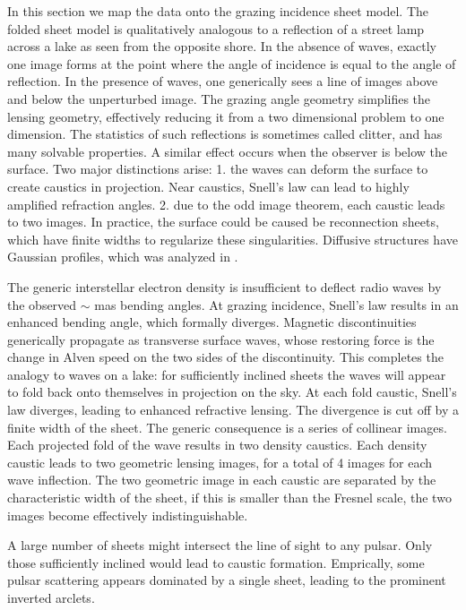 \documentclass[useAMS,usenatbib]{mn2e}
\begin{document}
In this section we map the data onto the grazing incidence sheet
model.  The folded sheet model is qualitatively analogous to a
reflection of a street lamp across a lake as seen from the opposite
shore.  In the absence of waves, exactly one image forms at the point
where the angle of incidence is equal to the angle of reflection.  In
the presence of waves, one generically sees a line of images above and
below the unperturbed image.  The grazing angle geometry simplifies
the lensing geometry, effectively reducing it from a two dimensional problem to
one dimension.  The statistics of such reflections is sometimes called
clitter, and has many solvable
properties\citep{LonguetHiggins1960}. 
A similar effect occurs when the
observer is below the surface.  Two major distinctions arise: 1. the
waves can deform the surface to create caustics in projection. Near
caustics, Snell's law can lead to highly amplified refraction
angles. 2. due to the odd image theorem, each caustic leads to two
images.  In practice, the surface could be caused be reconnection
sheets\citep{2015MNRAS.450.3201B}, which have finite widths to
regularize these singularities. Diffusive structures have Gaussian
profiles, which was analyzed in \citet{2012MNRAS.421L.132P}.

The generic interstellar electron density is insufficient to deflect
radio waves by the observed $\sim$ mas bending angles. At grazing
incidence, Snell's law results in an enhanced bending angle, which
formally diverges.  Magnetic discontinuities generically propagate
as transverse surface waves, whose restoring force is the change in Alven
speed on the two sides of the discontinuity. This completes the
analogy to waves on a lake: for sufficiently inclined sheets the waves
will appear to fold back onto themselves in projection on the sky.  At
each fold caustic, Snell's law diverges, leading to enhanced
refractive lensing.  The divergence is cut off by a finite width of
the sheet.  The generic consequence is a series of collinear images.
Each projected fold of the wave results in two density caustics.  Each density
caustic leads to two geometric lensing images, for a total of 4 images
for each wave inflection.  The two geometric image in each caustic are
separated by the characteristic width of the sheet, if this is smaller
than the Fresnel scale, the two images become effectively
indistinguishable. 

A large number of sheets might intersect the line of sight to any
pulsar. Only those sufficiently inclined would lead to caustic
formation. Emprically, some pulsar scattering appears dominated by a
single sheet, leading to the prominent inverted
arclets\citep{2001ApJ...549L..97S}.
\end{document}
